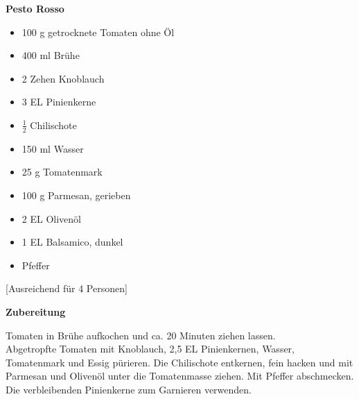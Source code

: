 

\parindent0pt	

\pagestyle{empty}


\textbf{{\LARGE Pesto Rosso}}%


\hrulefill
\vspace*{\fill}
\begin{multicols}{2}	


\begin{itemize}
\item 100 g 	getrocknete Tomaten ohne Öl
\item 400 ml 	Brühe
\item 2 Zehen 	Knoblauch
\item 3 EL 	Pinienkerne
\item $\frac{1}{2}$  	Chilischote
\item 150 ml 	Wasser
\item 25 g 	Tomatenmark
\item 100 g 	Parmesan, gerieben
\item 2 EL 	Olivenöl
\item 1 EL 	Balsamico, dunkel
\item Pfeffer 

\end{itemize}

\end{multicols}

\vspace{1cm}
\begin{center}
[Ausreichend für 4 Personen]
\end{center}

\vfill
\newpage
\textbf{{\LARGE Zubereitung}}%

\hrulefill

\vspace*{\fill}
\begin{multicols}{2}


Tomaten in Brühe aufkochen und ca. 20 Minuten ziehen lassen.\\
 
Abgetropfte Tomaten mit Knoblauch, 2,5 EL Pinienkernen, Wasser, Tomatenmark und Essig pürieren. 
Die Chilischote entkernen, fein hacken und mit Parmesan und Olivenöl unter die Tomatenmasse ziehen. 
Mit Pfeffer abschmecken.\\

Die verbleibenden Pinienkerne zum Garnieren verwenden.



\end{multicols}
\vfill
